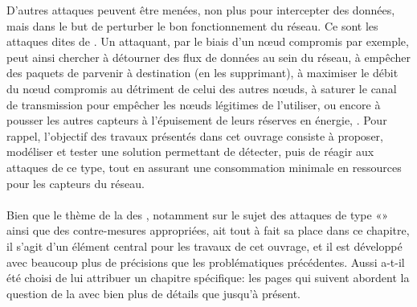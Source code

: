 D'autres attaques peuvent être menées, non plus pour intercepter des données, mais dans le but de perturber le bon fonctionnement du réseau.
Ce sont les attaques dites de \textit{\dds}.
Un attaquant, par le biais d'un nœud compromis par exemple, peut ainsi chercher à détourner des flux de données au sein du réseau, à empêcher des paquets de parvenir à destination (en les supprimant), à maximiser le débit du nœud compromis au détriment de celui des autres nœuds, à saturer le canal de transmission pour empêcher les nœuds légitimes de l'utiliser, ou encore à pousser les autres capteurs à l'épuisement de leurs réserves en énergie, \etc.
Pour rappel, l'objectif des travaux présentés dans cet ouvrage consiste à proposer, modéliser et tester une solution permettant de détecter, puis de réagir aux attaques de ce type, tout en assurant une consommation minimale en ressources pour les capteurs du réseau.

\paragraph{}
Bien que le thème de la \secu des \rcsfs, notamment sur le sujet des attaques de type «\dds» ainsi que des contre-mesures appropriées, ait tout à fait sa place dans ce chapitre, il s'agit d'un élément central pour les travaux de cet ouvrage, et il est développé avec beaucoup plus de précisions que les problématiques précédentes.
Aussi a-t-il été choisi de lui attribuer un chapitre spécifique: les pages qui suivent abordent la question de la \secu avec bien plus de détails que jusqu'à présent.
